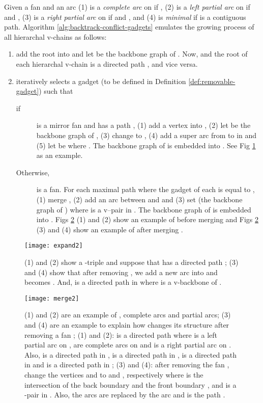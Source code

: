 \documentclass[11pt]{article}
\begin{document}
Given a fan  and an arc 
(1)  is a \emph{complete arc} on  if
,
(2)  is a \emph{left partial arc} on  if
 and ,
(3)  is a \emph{right partial arc} on  if
 and , and
(4)  is \emph{minimal} if
 is a contiguous path.
Algorithm \ref{alg:backtrack-conflict-gadgets}
emulates the growing process of all hierarchal v-chains  as follows:
\begin{enumerate}
\item add the root  into  and
let  be the backbone graph 
of .
Now,  and
the root  of each hierarchal v-chain  is a directed path ,
and vice versa.

\item iteratively selects a gadget 
(to be defined in Definition \ref{def:removable-gadget})
such that
\begin{description}
\item [if]  is a mirror fan and has a path
,
(1) add a vertex  into ,
(2) let  be the backbone graph  of ,
(3) change  to ,
(4) add a super arc from  to  in  and
(5) let  be  where .
The backbone graph of  is embedded into .
See Fig \ref{fig:expand} as an example.



\item [Otherwise,]  is a fan.
For each maximal path 
where the gadget  of each  is equal to ,
(1) merge ,
(2) add an arc  between  and 
and (3) set 
(the backbone graph of )
where  is a v--pair in .
The backbone graph of  is embedded into .
Figs \ref{fig:merge} (1) and (2) show an example of 
before merging  and
Figs \ref{fig:merge} (3) and (4) show an example of 
after merging .
\end{description}
\end{enumerate}

\begin{figure}[t]
\centering
\texttt{[image: expand2]}
\caption{(1) and (2) show a -triple  and
suppose that  has a directed path   ;
(3) and (4) show that after removing , we add a new arc  into
 and
 becomes   . And,
   is a directed path in 
where   
is a v-backbone of .
}
\label{fig:expand}
\end{figure}



\begin{figure}[t]
\centering
\texttt{[image: merge2]}
\caption{
(1) and (2) are an example of , complete arcs and partial arcs;
(3) and (4) are an example to explain how  changes its structure after removing
a fan ;
(1) and (2):  is a directed path 
where  is a left partial arc on ,
 are complete arcs on  and
 is a right partial arc on .
Also,   
is a directed path in ,
 is a directed path in ,
 is a directed path in  and
 is a directed path in ;
(3) and (4): after removing the fan ,
change the vertices  and  to
 and , respectively
where  is the intersection of the back boundary 
and the front boundary ,
and  is a -pair in .
Also, the arcs  are replaced by the arc 
and  is the path .
}
\label{fig:merge}
\end{figure}
\end{document}
